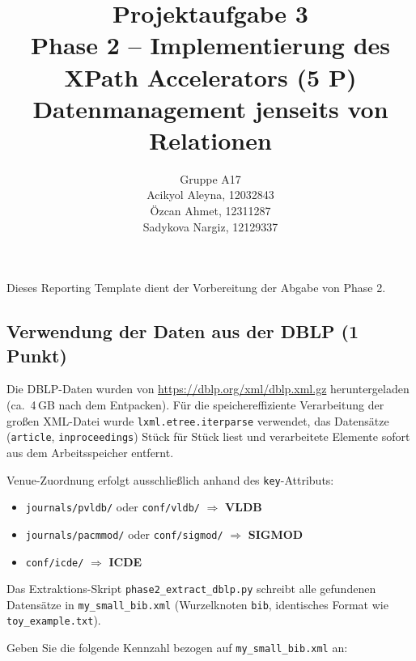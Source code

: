 \documentclass[11pt]{scrartcl}
\title{
  \textbf{\large Projektaufgabe 3 } \\
  Phase 2 – Implementierung des XPath Accelerators (5 P) \\
  {\large Datenmanagement jenseits von Relationen}
}
\author{
  Gruppe A17 \\
  \large Acikyol Aleyna, 12032843 \\
  \large Özcan Ahmet, 12311287 \\
  \large Sadykova Nargiz, 12129337
}
\begin{document}
\maketitle\thispagestyle{empty}

Dieses Reporting Template dient der Vorbereitung der Abgabe von Phase 2.

\subsection*{Verwendung der Daten aus der DBLP (1 Punkt)}

Die DBLP-Daten wurden von \url{https://dblp.org/xml/dblp.xml.gz} heruntergeladen (ca.\ 4\,GB nach dem Entpacken).
Für die speichereffiziente Verarbeitung der großen XML-Datei wurde \texttt{lxml.etree.iterparse}
verwendet, das Datensätze (\texttt{article}, \texttt{inproceedings}) Stück für Stück liest und
verarbeitete Elemente sofort aus dem Arbeitsspeicher entfernt.

Venue-Zuordnung erfolgt ausschließlich anhand des \texttt{key}-Attributs:
\begin{itemize}
  \item \texttt{journals/pvldb/} oder \texttt{conf/vldb/} $\Rightarrow$ \textbf{VLDB}
  \item \texttt{journals/pacmmod/} oder \texttt{conf/sigmod/} $\Rightarrow$ \textbf{SIGMOD}
  \item \texttt{conf/icde/} $\Rightarrow$ \textbf{ICDE}
\end{itemize}

Das Extraktions-Skript \texttt{phase2\_extract\_dblp.py} schreibt alle gefundenen Datensätze
in \texttt{my\_small\_bib.xml} (Wurzelknoten \texttt{bib}, identisches Format wie \texttt{toy\_example.txt}).

Geben Sie die folgende Kennzahl bezogen auf \texttt{my\_small\_bib.xml} an:
\end{document}
